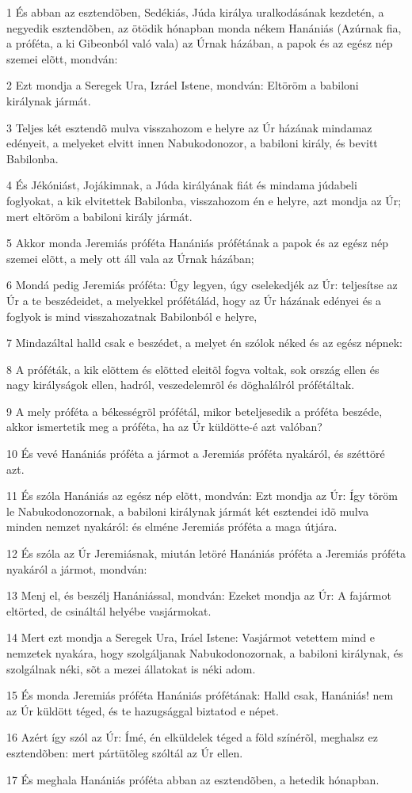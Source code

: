 \par 1 És abban az esztendõben, Sedékiás, Júda királya uralkodásának kezdetén, a negyedik esztendõben, az ötödik hónapban monda nékem Hanániás (Azúrnak fia, a próféta, a ki Gibeonból való vala) az Úrnak házában, a papok és az egész nép szemei elõtt, mondván:
\par 2 Ezt mondja a Seregek Ura, Izráel Istene, mondván: Eltöröm a babiloni királynak jármát.
\par 3 Teljes két esztendõ mulva visszahozom e helyre az Úr házának mindamaz edényeit, a melyeket elvitt innen Nabukodonozor, a babiloni király, és bevitt Babilonba.
\par 4 És Jékóniást, Jojákimnak, a Júda királyának fiát és mindama júdabeli foglyokat, a kik elvitettek Babilonba, visszahozom én e helyre, azt mondja az Úr; mert eltöröm a babiloni király jármát.
\par 5 Akkor monda Jeremiás próféta Hanániás prófétának a papok és az egész nép szemei elõtt, a mely ott áll vala az Úrnak házában;
\par 6 Mondá pedig Jeremiás próféta: Úgy legyen, úgy cselekedjék az Úr: teljesítse az Úr a te beszédeidet, a melyekkel prófétálád, hogy az Úr házának edényei és a foglyok is mind visszahozatnak Babilonból e helyre,
\par 7 Mindazáltal halld csak e beszédet, a melyet én szólok néked és az egész népnek:
\par 8 A próféták, a kik elõttem és elõtted eleitõl fogva voltak, sok ország ellen és nagy királyságok ellen, hadról, veszedelemrõl és döghalálról prófétáltak.
\par 9 A mely próféta a békességrõl prófétál, mikor beteljesedik a próféta beszéde, akkor ismertetik meg a próféta, ha az Úr küldötte-é azt valóban?
\par 10 És vevé Hanániás próféta a jármot a Jeremiás próféta nyakáról, és széttöré azt.
\par 11 És szóla Hanániás az egész nép elõtt, mondván: Ezt mondja az Úr: Így töröm le Nabukodonozornak, a babiloni királynak jármát két esztendei idõ mulva minden nemzet nyakáról: és elméne Jeremiás próféta a maga útjára.
\par 12 És szóla az Úr Jeremiásnak, miután letöré Hanániás próféta a Jeremiás próféta nyakáról a jármot, mondván:
\par 13 Menj el, és beszélj Hanániással, mondván: Ezeket mondja az Úr: A fajármot eltörted, de csináltál helyébe vasjármokat.
\par 14 Mert ezt mondja a Seregek Ura, Iráel Istene: Vasjármot vetettem mind e nemzetek nyakára, hogy szolgáljanak Nabukodonozornak, a babiloni királynak, és szolgálnak néki, sõt a mezei állatokat is néki adom.
\par 15 És monda Jeremiás próféta Hanániás prófétának: Halld csak, Hanániás! nem az Úr küldött téged, és te hazugsággal biztatod e népet.
\par 16 Azért így szól az Úr: Ímé, én elküldelek téged a föld színérõl, meghalsz ez esztendõben: mert pártütõleg szóltál az Úr ellen.
\par 17 És meghala Hanániás próféta abban az esztendõben, a hetedik hónapban.

